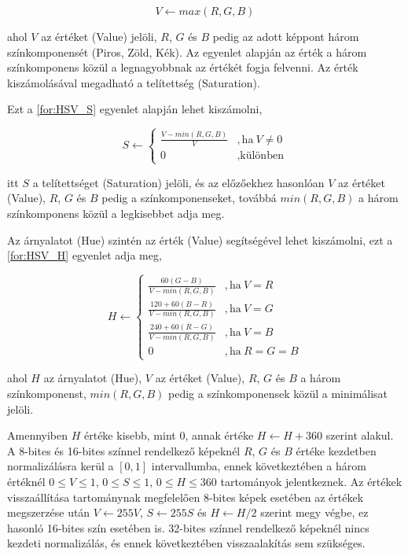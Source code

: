 \begin{equation}
    V \leftarrow max(R,G,B)
    \label{for:HSV_V}
\end{equation}

\par ahol $V$ az értéket (Value) jelöli, $R$, $G$ és $B$ pedig az adott képpont három színkomponensét (Piros, Zöld, Kék). Az egyenlet alapján az érték a három színkomponens közül a legnagyobbnak az értékét fogja felvenni. Az érték kiszámolásával megadható a telítettség (Saturation).
\par Ezt a \ref{for:HSV_S} egyenlet alapján lehet kiszámolni,

\begin{equation}
    S \leftarrow
    \begin{cases}
        \frac{V-min(R,G,B)}{V} & ,\text{ha}\ V\neq0 \\
        0 & ,\text{különben}
    \end{cases}
    \label{for:HSV_S}
\end{equation}

\par itt $S$ a telítettséget (Saturation) jelöli, és az előzőekhez hasonlóan $V$ az értéket (Value), $R$, $G$ és $B$ pedig a színkomponenseket, továbbá $min(R,G,B)$ a három színkomponens közül a legkisebbet adja meg.
\par Az árnyalatot (Hue) szintén az érték (Value) segítségével lehet kiszámolni, ezt a \ref{for:HSV_H} egyenlet adja meg,

\begin{equation}
    H \leftarrow
    \begin{cases}
        \frac{60(G-B)}{V-min(R,G,B)} & ,\text{ha}\ V=R \\[5pt]
        \frac{120+60(B-R)}{V-min(R,G,B)} & ,\text{ha}\ V=G \\[5pt]
        \frac{240+60(R-G)}{V-min(R,G,B)} & ,\text{ha}\ V=B \\[5pt]
        0 & ,\text{ha}\ R=G=B
    \end{cases}
    \label{for:HSV_H}
\end{equation}

\par ahol $H$ az árnyalatot (Hue), $V$ az értéket (Value), $R$, $G$ és $B$ a három színkomponenst, $min(R,G,B)$ pedig a színkomponensek közül a minimálisat jelöli.
\par Amennyiben $H$ értéke kisebb, mint $0$, annak értéke $H \leftarrow H+360$ szerint alakul. A 8-bites és 16-bites színnel rendelkező képeknél $R$, $G$ és $B$ értéke kezdetben normalizálásra kerül a $[0,1]$ intervallumba, ennek következtében a három értéknél $0 \le V \le 1$, $0 \le S \le 1$, $0 \le H \le 360$ tartományok jelentkeznek. Az értékek visszaállítása tartománynak megfelelően 8-bites képek esetében az értékek megszerzése után $V \leftarrow 255V$, $S \leftarrow 255S$ és $H \leftarrow H/2$ szerint megy végbe, ez hasonló 16-bites szín esetében is. 32-bites színnel rendelkező képeknél nincs kezdeti normalizálás, és ennek következtében visszaalakítás sem szükséges.

